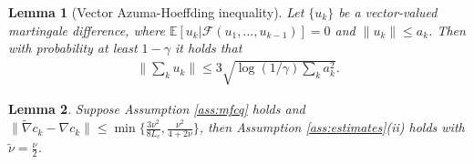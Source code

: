 \documentclass[11pt]{article}
\newcommand{\E}{\mathbb{E}}
\newtheorem{lemma}{Lemma}
\begin{document}
\begin{lemma}[Vector Azuma-Hoeffding inequality]\label{lm:vazuma}
Let $\{u_k\}$ be a vector-valued martingale difference, where $\E[u_k|\mathcal F(u_1,...,u_{k-1})] = 0$ and $\|u_k\| \leq a_k$. Then with probability at least $1-\gamma$ it holds that
\begin{align*}
    \bigg\|\sum_k u_k\bigg\| \leq 3\sqrt{\log(1/\gamma)\sum_k a_k^2}.
\end{align*}
\end{lemma}


\begin{lemma}\label{lm:ass-est}
    Suppose Assumption \ref{ass:mfcq} holds and \(\|\tilde \nabla c_k - \nabla c_k\| \leq \min \{\frac{3\nu^2}{8L_c},\frac{\nu^2}{4+2\nu}\}\), then Assumption \ref{ass:estimates}(ii) holds with \(\tilde \nu = \frac{\nu}{2}\).
\end{lemma}
\end{document}
